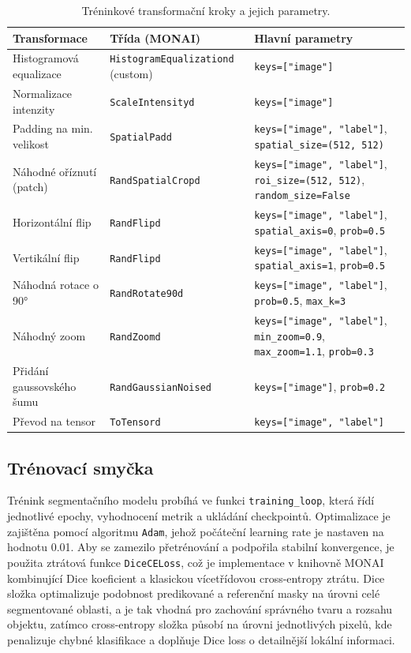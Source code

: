 \documentclass[male,czech,api_bc]{kitheses}
\begin{document}
\begin{table}[H]
\centering
\caption{Tréninkové transformační kroky a jejich parametry.}
\label{tab:train_transforms}
\small
\begin{tabular}{p{3.5cm} p{5cm} p{5.5cm}}
\toprule
\textbf{Transformace} & \textbf{Třída (MONAI)} & \textbf{Hlavní parametry} \\
\midrule
Histogramová equalizace & \texttt{HistogramEqualizationd} (custom) & \texttt{keys=["image"]} \\
Normalizace intenzity & \texttt{ScaleIntensityd} & \texttt{keys=["image"]} \\
Padding na min. velikost & \texttt{SpatialPadd} & \texttt{keys=["image", "label"]}, \texttt{spatial\_size=(512, 512)} \\
Náhodné oříznutí (patch) & \texttt{RandSpatialCropd} & \texttt{keys=["image", "label"]}, \texttt{roi\_size=(512, 512)}, \texttt{random\_size=False} \\
Horizontální flip & \texttt{RandFlipd} & \texttt{keys=["image", "label"]}, \texttt{spatial\_axis=0}, \texttt{prob=0.5} \\
Vertikální flip & \texttt{RandFlipd} & \texttt{keys=["image", "label"]}, \texttt{spatial\_axis=1}, \texttt{prob=0.5} \\
Náhodná rotace o 90° & \texttt{RandRotate90d} & \texttt{keys=["image", "label"]}, \texttt{prob=0.5}, \texttt{max\_k=3} \\
Náhodný zoom & \texttt{RandZoomd} & \texttt{keys=["image", "label"]}, \texttt{min\_zoom=0.9}, \texttt{max\_zoom=1.1}, \texttt{prob=0.3} \\
Přidání gaussovského šumu & \texttt{RandGaussianNoised} & \texttt{keys=["image"]}, \texttt{prob=0.2} \\
Převod na tensor & \texttt{ToTensord} & \texttt{keys=["image", "label"]} \\
\bottomrule
\end{tabular}
\end{table}

\subsection*{Trénovací smyčka}

Trénink segmentačního modelu probíhá ve funkci \texttt{training\_loop}, která řídí jednotlivé epochy, vyhodnocení metrik a ukládání checkpointů. Optimalizace je zajištěna pomocí algoritmu \texttt{Adam}, jehož počáteční learning rate je nastaven na hodnotu 0.01. Aby se zamezilo přetrénování a podpořila stabilní konvergence, je použita ztrátová funkce \texttt{DiceCELoss}, což je implementace v knihovně MONAI kombinující Dice koeficient a klasickou vícetřídovou cross-entropy ztrátu. Dice složka optimalizuje podobnost predikované a referenční masky na úrovni celé segmentované oblasti, a je tak vhodná pro zachování správného tvaru a rozsahu objektu, zatímco cross-entropy složka působí na úrovni jednotlivých pixelů, kde penalizuje chybné klasifikace a doplňuje Dice loss o detailnější lokální informaci.
\end{document}
